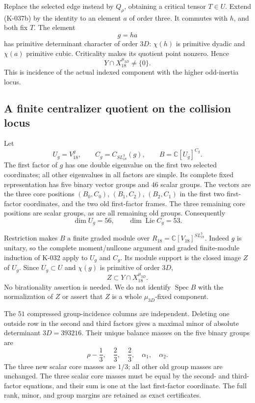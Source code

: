 Replace the selected edge instead by $Q_\rho$, obtaining a
critical tensor $T\in U$. Extend (K-037b) by the identity
to an element $a$ of order three. It commutes with $h$,
and both fix $T$. The element
\[
                                  g=ha                    \tag{K-037g}
\]
has primitive determinant character of order $3D$:
$\chi(h)$ is primitive dyadic and $\chi(a)$ primitive cubic.
Criticality makes its quotient point nonzero. Hence
\[
                    Y\cap X_{18}^{\mu_{3D}}\ne\{0\}.       \tag{K-037h}
\]
This is incidence of the actual indexed component with the
higher odd-inertia locus.

\subsection*{A finite centralizer quotient on the collision locus}

Let
\[
 U_g=V_{18}^g,\qquad C_g=C_{SL_{18}^3}(g),\qquad
                       B=\mathbb C[U_g]^{C_g}.            \tag{K-037i}
\]
The first factor of $g$ has one double eigenvalue on the
first two selected coordinates; all other eigenvalues in
all factors are simple. Its complete fixed representation
has five binary vector groups and $46$ scalar groups.
The vectors are the three core positions
$(B_0,C_0)$, $(B_1,C_2)$, $(B_2,C_1)$ in the first two
first-factor coordinates, and the two old first-factor
frames. The three remaining core positions are scalar
groups, as are all remaining old groups. Consequently
\[
                 \dim U_g=56,\qquad
                 \dim\operatorname{Lie}C_g=53.            \tag{K-037j}
\]

Restriction makes $B$ a finite graded module over
$R_{18}=\mathbb C[V_{18}]^{SL_{18}^3}$. Indeed $g$ is
unitary, so the complete moment/nullcone argument and
graded finite-module induction of K-032 apply to $U_g$
and $C_g$. Its module support is the closed image $Z$ of
$U_g$. Since $U_g\subset U$ and $\chi(g)$ is primitive
of order $3D$,
\[
                         Z\subset Y\cap X_{18}^{\mu_{3D}}.
                                                            \tag{K-037k}
\]
No birationality assertion is needed. We do not identify
$\operatorname{Spec}B$ with the normalization of $Z$ or
assert that $Z$ is a whole $\mu_{3D}$-fixed component.

The $51$ compressed group-incidence columns are independent.
Deleting one outside row in the second and third factors
gives a maximal minor of absolute determinant
$3D=393216$. Their unique balance masses on the five binary
groups are
\[
                 \rho-\frac13,\quad\frac23,\quad\frac23,
                            \quad\alpha_1,\quad\alpha_2. \tag{K-037l}
\]
The three new scalar core masses are $1/3$; all other
old group masses are unchanged. The three scalar core
masses must be equal by the second- and third-factor
equations, and their sum is one at the last first-factor
coordinate. The full rank, minor, and group margins are
retained as exact certificates.

